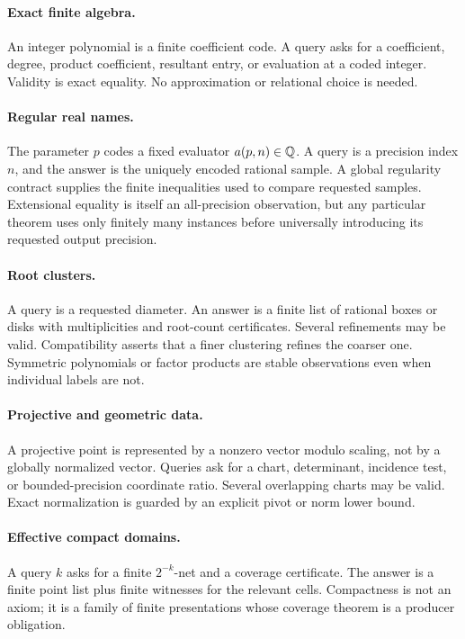 \paragraph{Exact finite algebra.}
An integer polynomial is a finite coefficient code.  A query asks for a coefficient, degree, product coefficient, resultant entry, or evaluation at a coded integer.  Validity is exact equality.  No approximation or relational choice is needed.

\paragraph{Regular real names.}
The parameter \(p\) codes a fixed evaluator \(a(p,n)\in\mathbb{Q}\).  A query is a precision index \(n\), and the answer is the uniquely encoded rational sample.  A global regularity contract supplies the finite inequalities used to compare requested samples.  Extensional equality is itself an all-precision observation, but any particular theorem uses only finitely many instances before universally introducing its requested output precision.

\paragraph{Root clusters.}
A query is a requested diameter.  An answer is a finite list of rational boxes or disks with multiplicities and root-count certificates.  Several refinements may be valid.  Compatibility asserts that a finer clustering refines the coarser one.  Symmetric polynomials or factor products are stable observations even when individual labels are not.

\paragraph{Projective and geometric data.}
A projective point is represented by a nonzero vector modulo scaling, not by a globally normalized vector.  Queries ask for a chart, determinant, incidence test, or bounded-precision coordinate ratio.  Several overlapping charts may be valid.  Exact normalization is guarded by an explicit pivot or norm lower bound.

\paragraph{Effective compact domains.}
A query \(k\) asks for a finite \(2^{-k}\)-net and a coverage certificate.  The answer is a finite point list plus finite witnesses for the relevant cells.  Compactness is not an axiom; it is a family of finite presentations whose coverage theorem is a producer obligation.

